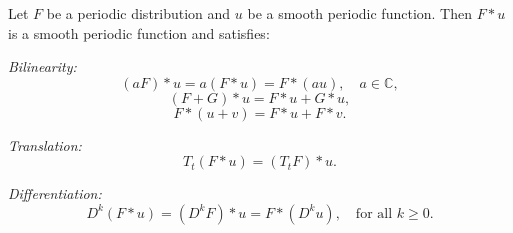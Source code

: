 Let $F$ be a periodic distribution and $u$ be a smooth periodic function. Then $F * u$ is a smooth periodic function and satisfies:

\textit{Bilinearity:}
$$(aF) * u = a(F * u) = F * (au), \quad a \in \mathbb{C},$$
$$(F + G) * u = F * u + G * u,$$
$$F * (u + v) = F * u + F * v.$$

\textit{Translation:}
$$T_t(F * u) = (T_t F) * u.$$

\textit{Differentiation:}
$$D^k(F * u) = (D^k F) * u = F * (D^k u), \quad \text{for all } k \geq 0.$$
